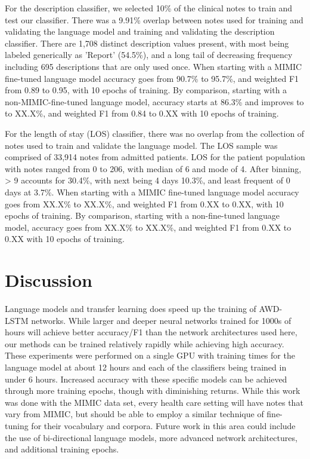 \documentclass{amia}
\begin{document}
For the description classifier, we selected 10\% of the clinical notes to train and test our classifier. There was a 9.91\% overlap between notes used for training and validating the language model and training and validating the description classifier. There are 1,708 distinct description values present, with most being labeled generically as 'Report' (54.5\%), and a long tail of decreasing frequency including 695 descriptions that are only used once. When starting with a MIMIC fine-tuned language model accuracy goes from 90.7\% to 95.7\%, and weighted F1 from 0.89 to 0.95, with 10 epochs of training. By comparison, starting with a non-MIMIC-fine-tuned language model, accuracy starts at 86.3\% and improves to to XX.X\%, and weighted F1 from 0.84 to 0.XX with 10 epochs of training.

For the length of stay (LOS) classifier, there was no overlap from the collection of notes used to train and validate the language model. The LOS sample was comprised of 33,914 notes from admitted patients. LOS for the patient population with notes ranged from 0 to 206, with median of 6 and mode of 4. After binning, > 9 accounts for 30.4\%, with next being 4 days 10.3\%, and least frequent of 0 days at 3.7\%. When starting with a MIMIC fine-tuned language model accuracy goes from XX.X\% to XX.X\%, and weighted F1 from 0.XX to 0.XX, with 10 epochs of training. By comparison, starting with a non-fine-tuned language model, accuracy goes from XX.X\% to XX.X\%, and weighted F1 from 0.XX to 0.XX with 10 epochs of training.

\section*{Discussion}

Language models and transfer learning does speed up the training of AWD-LSTM networks. While larger and deeper neural networks trained for 1000s of hours will achieve better accuracy/F1 than the network architectures used here, our methods can be trained relatively rapidly while achieving high accuracy. These experiments were performed on a single GPU with training times for the language model at about 12 hours and each of the classifiers being trained in under 6 hours. Increased accuracy with these specific models can be achieved through more training epochs, though with diminishing returns. While this work was done with the MIMIC data set, every health care setting will have notes that vary from MIMIC, but should be able to employ a similar technique of fine-tuning for their vocabulary and corpora. Future work in this area could include the use of bi-directional language models, more advanced network architectures, and additional training epochs.
\end{document}
